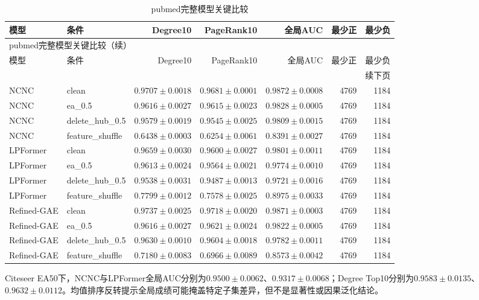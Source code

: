 \documentclass[UTF8,a4paper,11pt,fontset=fandol]{ctexart}
\begin{document}
{\footnotesize
\setlength{\tabcolsep}{3pt}
\begin{longtable}{llrrr rr}
\caption{pubmed完整模型关键比较}\\
\toprule
模型 & 条件 & Degree10 & PageRank10 & 全局AUC & 最少正 & 最少负 \\
\midrule
\endfirsthead
\multicolumn{7}{l}{pubmed完整模型关键比较（续）}\\
\toprule
模型 & 条件 & Degree10 & PageRank10 & 全局AUC & 最少正 & 最少负 \\
\midrule
\endhead
\midrule\multicolumn{7}{r}{续下页}\\
\endfoot
\bottomrule\endlastfoot
NCNC & clean & $0.9707\pm0.0018$ & $0.9681\pm0.0001$ & $0.9872\pm0.0008$ & 4769 & 1184 \\
NCNC & ea\_0.5 & $0.9616\pm0.0027$ & $0.9615\pm0.0023$ & $0.9828\pm0.0005$ & 4769 & 1184 \\
NCNC & delete\_hub\_0.5 & $0.9579\pm0.0019$ & $0.9545\pm0.0025$ & $0.9809\pm0.0015$ & 4769 & 1184 \\
NCNC & feature\_shuffle & $0.6438\pm0.0003$ & $0.6254\pm0.0061$ & $0.8391\pm0.0027$ & 4769 & 1184 \\
LPFormer & clean & $0.9659\pm0.0030$ & $0.9600\pm0.0027$ & $0.9801\pm0.0011$ & 4769 & 1184 \\
LPFormer & ea\_0.5 & $0.9613\pm0.0024$ & $0.9564\pm0.0021$ & $0.9774\pm0.0010$ & 4769 & 1184 \\
LPFormer & delete\_hub\_0.5 & $0.9538\pm0.0031$ & $0.9487\pm0.0013$ & $0.9721\pm0.0016$ & 4769 & 1184 \\
LPFormer & feature\_shuffle & $0.7799\pm0.0012$ & $0.7578\pm0.0025$ & $0.8975\pm0.0033$ & 4769 & 1184 \\
Refined-GAE & clean & $0.9737\pm0.0025$ & $0.9718\pm0.0020$ & $0.9871\pm0.0003$ & 4769 & 1184 \\
Refined-GAE & ea\_0.5 & $0.9616\pm0.0027$ & $0.9621\pm0.0024$ & $0.9822\pm0.0005$ & 4769 & 1184 \\
Refined-GAE & delete\_hub\_0.5 & $0.9630\pm0.0010$ & $0.9604\pm0.0018$ & $0.9782\pm0.0011$ & 4769 & 1184 \\
Refined-GAE & feature\_shuffle & $0.7180\pm0.0083$ & $0.6966\pm0.0089$ & $0.8573\pm0.0042$ & 4769 & 1184 \\
\end{longtable}
}
Citeseer EA50下，NCNC与LPFormer全局AUC分别为$0.9500\pm0.0062$、$0.9317\pm0.0068$；Degree Top10分别为$0.9583\pm0.0135$、$0.9632\pm0.0112$。均值排序反转提示全局成绩可能掩盖特定子集差异，但不是显著性或因果泛化结论。
\end{document}
